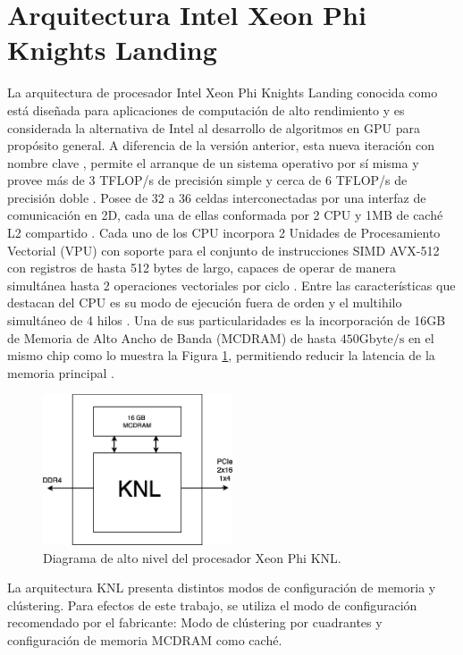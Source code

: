 \section{Arquitectura Intel Xeon Phi Knights Landing}
\label{ch:marco_xeonphi}

La arquitectura de procesador Intel Xeon Phi Knights Landing conocida como  está dise\~nada para aplicaciones de computación de alto rendimiento y es considerada la alternativa de Intel al desarrollo de algoritmos en GPU para propósito general. A diferencia de la versión anterior, esta nueva iteración con nombre clave , permite el arranque de un sistema operativo por sí misma y provee más de 3 TFLOP/s de precisión simple y cerca de 6 TFLOP/s de precisión doble \cite{Jeffers201663}. Posee de 32 a 36 celdas interconectadas por una interfaz de comunicación en 2D, cada una de ellas conformada por 2 CPU y 1MB de caché L2 compartido \cite{XeonPhiWhitePaper}. Cada uno de los CPU incorpora 2 Unidades de Procesamiento Vectorial (VPU) con soporte para el conjunto de instrucciones SIMD AVX-512 con registros de hasta 512 bytes de largo, capaces de operar de manera simult\'anea hasta 2 operaciones vectoriales por ciclo \cite{XeonPhiWhitePaper}. 
Entre las características que destacan del CPU es su modo de ejecución fuera de orden y el multihilo simultáneo de 4 hilos \cite{XeonPhiWhitePaper}. Una de sus particularidades es la incorporación de 16GB de Memoria de Alto Ancho de Banda (MCDRAM) de hasta $450 \text{Gbyte/s}$ en el mismo chip como lo muestra la Figura \ref{fig:cpu_phi}, permitiendo reducir la latencia de la memoria principal \cite{XeonPhiWhitePaper}.

\begin{figure}[htb]
\centering
\includegraphics[width=0.5\textwidth]{fig/cpu}
\caption{Diagrama de alto nivel del procesador Xeon Phi KNL.}
\label{fig:cpu_phi}
\end{figure}


La arquitectura KNL presenta distintos modos de configuración de memoria y clústering. Para efectos de este trabajo, se utiliza el modo de configuración recomendado por el fabricante: Modo de cl\'ustering por cuadrantes y configuración de memoria MCDRAM como caché.



